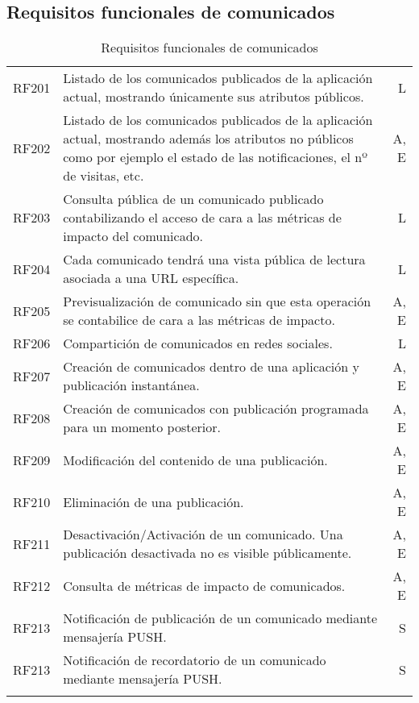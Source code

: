 \subsection{Requisitos funcionales de comunicados}
\label{cuadro:requisitos-funcionales-de-comunicados}
\begin{longtable}{l|p{13cm}|r}
  RF201\label{RF201} & Listado de los comunicados publicados de la aplicación actual, mostrando únicamente sus atributos públicos. & L \\
  RF202\label{RF202} & Listado de los comunicados publicados de la aplicación actual, mostrando además los atributos no públicos como por ejemplo el estado de las notificaciones, el nº de visitas, etc. & A, E \\
  RF203\label{RF203} & Consulta pública de un comunicado publicado contabilizando el acceso de cara a las métricas de impacto del comunicado. & L \\
  RF204\label{RF204} & Cada comunicado tendrá una vista pública de lectura asociada a una URL específica. & L \\
  RF205\label{RF205} & Previsualización de comunicado sin que esta operación se contabilice de cara a las métricas de impacto. & A, E \\
  RF206\label{RF206} & Compartición de comunicados en redes sociales. & L \\
  RF207\label{RF207} & Creación de comunicados dentro de una aplicación y publicación instantánea. & A, E \\
  RF208\label{RF208} & Creación de comunicados con publicación programada para un momento posterior. & A, E \\
  RF209\label{RF209} & Modificación del contenido de una publicación. & A, E \\
  RF210\label{RF210} & Eliminación de una publicación. & A, E \\
  RF211\label{RF211} & Desactivación/Activación de un comunicado. Una publicación desactivada no es visible públicamente. & A, E \\
  RF212\label{RF212} & Consulta de métricas de impacto de comunicados. & A, E \\
  RF213\label{RF213} & Notificación de publicación de un comunicado mediante mensajería PUSH. & S \\
  RF213\label{RF213} & Notificación de recordatorio de un comunicado mediante mensajería PUSH. & S \\
  \caption{Requisitos funcionales de comunicados} \\
\end{longtable}

